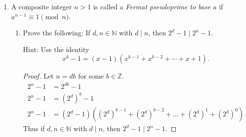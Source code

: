 \documentclass[11pt]{article}
\theoremstyle{definition}
\newcommand{\ZZ}{\mathbb{Z}}
\newcommand{\NN}{\mathbb{N}}
\begin{document}
\begin{enumerate}
\begin{enumerate}
        \item Use induction on $a$ together with the binomial theorem\footnote{Binomial theorem: $\displaystyle(a+1)^p = a^p + {p\choose 1}a^{p-1}+\cdots + {p\choose k}a^{p-k} + \cdots + {p\choose p-1}a + 1$} to give another proof of Fermat's Little Theorem.
        \begin{proof}
            We aim to prove $a^{p-1}\equiv 1\pmod{p}$ for a prime $p$ and $p\nmid a$. 
            It can be rewritten as $a^p\equiv a\pmod{p}$. \\
            Base case ($a=1$): $1^{p}\equiv 1\pmod{p}$. 
            \[ 1^{p}-1 = px \quad\text{ for some } x\in\ZZ \]
            This is true for any prime $p$ and $x=0$. \\
            \underline{Inductive Hypothesis}: Assume $a^p\equiv a\pmod{p}$ for an integer 
            $a\in\ZZ$ is true. \\
            Consider $a+1$:
            \[
                (a+1)^{p} = a^p + {p\choose 1}a^{p-1}+\cdots + {p\choose k}a^{p-k} + \cdots + {p\choose p-1}a + 1 \\
            \]
            By (a), each binomial coefficient ${p\choose k}$ is divisible by $p$ since $p$ is prime. 
            So, if we take $\pmod{p}$ of this sum, we are left with:
            \begin{align*}
                (a+1)^{p} \equiv a^p + 1 \pmod{p}
            \end{align*}
            $a^p\equiv a\pmod{p}$ is true for $a+1$, thus proving Fermat's Little Theorem.
        \end{proof}
        
    \end{enumerate}

    \item A composite integer $n>1$ is called a \emph{Fermat pseudoprime to base $a$} if $a^{n-1}\equiv 1\pmod n$.
        \begin{enumerate}
            \item Prove the following: If $d,n\in \NN$ with $d\mid n$, then $2^d -1\mid 2^n-1$.
            
            Hint: Use the identity $$x^k-1 = (x-1)(x^{k-1}+x^{k-2}+\cdots+x+1).$$
            \begin{proof}
                Let $n=db$ for some $b\in\ZZ$.
                \begin{align*}
                    2^n-1 &= 2^{db}-1 \\
                    2^n-1 &= (2^d)^b-1 \\
                    2^n-1 &= (2^d-1)((2^d)^{b-1}+(2^d)^{b-2}+\dots+(2^d)^1+(2^d)^0)
                \end{align*}
                Thus if $d,n\in \NN$ with $d\mid n$, then $2^d -1\mid 2^n-1$.
            \end{proof}


\end{enumerate}
\end{enumerate}
\end{document}
